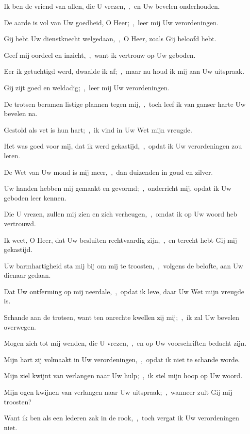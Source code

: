 \documentclass[12pt,twoside,a5paper]{article}
\begin{document}
\begin{halfparskip}
  Ik ben de vriend van allen, die U vrezen,~\sep\ en Uw bevelen onderhouden.

  De aarde is vol van Uw goedheid, O Heer;~\sep\ leer mij Uw verordeningen.

   Gij hebt Uw dienstknecht welgedaan,~\sep\ O Heer, zoals Gij beloofd hebt.

  Geef mij oordeel en inzicht,~\sep\ want ik vertrouw op Uw geboden.

  Eer ik getuchtigd werd, dwaalde ik af;~\sep\ maar nu houd ik mij aan Uw uitspraak.

  Gij zijt goed en weldadig;~\sep\ leer mij Uw verordeningen.

  De trotsen beramen listige plannen tegen mij,~\sep\ toch leef ik van ganser harte Uw bevelen na.

  Gestold als vet is hun hart;~\sep\ ik vind in Uw Wet mijn vreugde.

  Het was goed voor mij, dat ik werd gekastijd,~\sep\ opdat ik Uw verordeningen zou leren.

  De Wet van Uw mond is mij meer,~\sep\ dan duizenden in goud en zilver.

   Uw handen hebben mij gemaakt en gevormd;~\sep\ onderricht mij, opdat ik Uw geboden leer kennen.

  Die U vrezen, zullen mij zien en zich verheugen,~\sep\ omdat ik op Uw woord heb vertrouwd.

  Ik weet, O Heer, dat Uw besluiten rechtvaardig zijn,~\sep\ en terecht hebt Gij mij gekastijd.

  Uw barmhartigheid sta mij bij om mij te troosten,~\sep\ volgens de belofte, aan Uw dienaar gedaan.

  Dat Uw ontferming op mij neerdale,~\sep\ opdat ik leve, daar Uw Wet mijn vreugde is.

  Schande aan de trotsen, want ten onrechte kwellen zij mij;~\sep\ ik zal Uw bevelen overwegen.

  Mogen zich tot mij wenden, die U vrezen,~\sep\ en op Uw voorschriften bedacht zijn.

  Mijn hart zij volmaakt in Uw verordeningen,~\sep\ opdat ik niet te schande worde.

   Mijn ziel kwijnt van verlangen naar Uw hulp;~\sep\ ik stel mijn hoop op Uw woord.

  Mijn ogen kwijnen van verlangen naar Uw uitspraak;~\sep\ wanneer zult Gij mij troosten?

  Want ik ben als een lederen zak in de rook,~\sep\ toch vergat ik Uw verordeningen niet.


\end{halfparskip}
\end{document}
